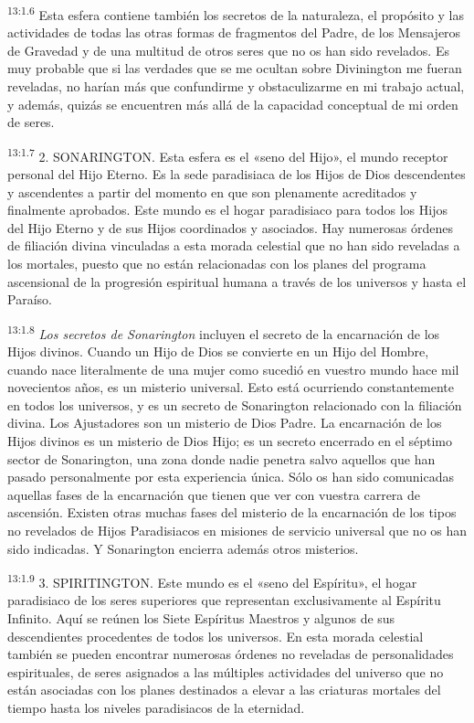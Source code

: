 \par
\textsuperscript{13:1.6} Esta esfera contiene también los secretos de la naturaleza, el propósito y las actividades de todas las otras formas de fragmentos del Padre, de los Mensajeros de Gravedad y de una multitud de otros seres que no os han sido revelados. Es muy probable que si las verdades que se me ocultan sobre Divinington me fueran reveladas, no harían más que confundirme y obstaculizarme en mi trabajo actual, y además, quizás se encuentren más allá de la capacidad conceptual de mi orden de seres.

\par
\textsuperscript{13:1.7} 2. SONARINGTON. Esta esfera es el «seno del Hijo», el mundo receptor personal del Hijo Eterno. Es la sede paradisiaca de los Hijos de Dios descendentes y ascendentes a partir del momento en que son plenamente acreditados y finalmente aprobados. Este mundo es el hogar paradisiaco para todos los Hijos del Hijo Eterno y de sus Hijos coordinados y asociados. Hay numerosas órdenes de filiación divina vinculadas a esta morada celestial que no han sido reveladas a los mortales, puesto que no están relacionadas con los planes del programa ascensional de la progresión espiritual humana a través de los universos y hasta el Paraíso.

\par
\textsuperscript{13:1.8} \textit{Los secretos de Sonarington} incluyen el secreto de la encarnación de los Hijos divinos. Cuando un Hijo de Dios se convierte en un Hijo del Hombre, cuando nace literalmente de una mujer como sucedió en vuestro mundo hace mil novecientos años, es un misterio universal. Esto está ocurriendo constantemente en todos los universos, y es un secreto de Sonarington relacionado con la filiación divina. Los Ajustadores son un misterio de Dios Padre. La encarnación de los Hijos divinos es un misterio de Dios Hijo; es un secreto encerrado en el séptimo sector de Sonarington, una zona donde nadie penetra salvo aquellos que han pasado personalmente por esta experiencia única. Sólo os han sido comunicadas aquellas fases de la encarnación que tienen que ver con vuestra carrera de ascensión. Existen otras muchas fases del misterio de la encarnación de los tipos no revelados de Hijos Paradisiacos en misiones de servicio universal que no os han sido indicadas. Y Sonarington encierra además otros misterios.

\par
\textsuperscript{13:1.9} 3. SPIRITINGTON. Este mundo es el «seno del Espíritu», el hogar paradisiaco de los seres superiores que representan exclusivamente al Espíritu Infinito. Aquí se reúnen los Siete Espíritus Maestros y algunos de sus descendientes procedentes de todos los universos. En esta morada celestial también se pueden encontrar numerosas órdenes no reveladas de personalidades espirituales, de seres asignados a las múltiples actividades del universo que no están asociadas con los planes destinados a elevar a las criaturas mortales del tiempo hasta los niveles paradisiacos de la eternidad.

